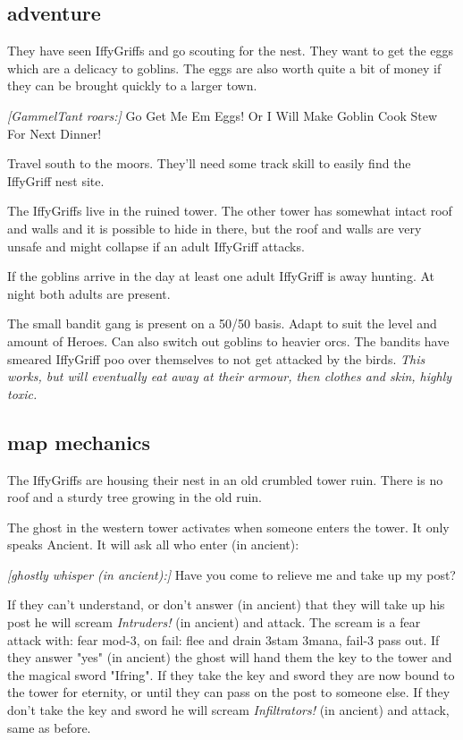 \subsection*{adventure}

They have seen IffyGriffs and go scouting for the nest. They want to get the eggs which are a delicacy to goblins. The eggs are also worth quite a bit of money if they can be brought quickly to a larger town.

\begin{readoutloud}
\emph{[GammelTant roars:]}
Go Get Me Em Eggs! Or I Will Make Goblin Cook Stew For Next Dinner!
\end{readoutloud}

\noindent Travel south to the moors. They'll need some track skill to easily find the IffyGriff nest site.

The IffyGriffs live in the ruined tower. The other tower has somewhat intact roof and walls and it is possible to hide in there, but the roof and walls are very unsafe and might collapse if an adult IffyGriff attacks.

If the goblins arrive in the day at least one adult IffyGriff is away hunting. At night both adults are present.

The small bandit gang is present on a 50/50 basis. Adapt to suit the level and amount of Heroes. Can also switch out goblins to heavier orcs. The bandits have smeared IffyGriff poo over themselves to not get attacked by the birds. \emph{This works, but will eventually eat away at their armour, then clothes and skin, highly toxic.}


\subsection*{map mechanics}

The IffyGriffs are housing their nest in an old crumbled tower ruin. There is no roof and a sturdy tree growing in the old ruin.

The ghost in the western tower activates when someone enters the tower. It only speaks Ancient. It will ask all who enter (in ancient):
\begin{readoutloud}
\emph{[ghostly whisper (in ancient):]}
Have you come to relieve me and take up my post?
\end{readoutloud}
\noindent If they can't understand, or don't answer (in ancient) that they will take up his post he will scream \emph{Intruders!} (in ancient) and attack. The scream is a fear attack with: fear mod-3, on fail: flee and drain 3stam 3mana, fail-3 pass out.
If they answer "yes" (in ancient) the ghost will hand them the key to the tower and the magical sword "Ifring". If they take the key and sword they are now bound to the tower for eternity, or until they can pass on the post to someone else. If they don't take the key and sword he will scream \emph{Infiltrators!} (in ancient) and attack, same as before.

